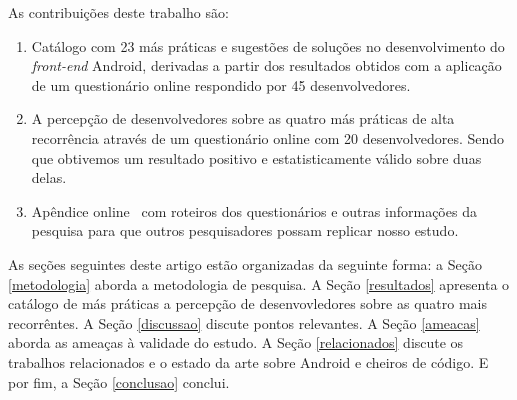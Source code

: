 
As contribuições deste trabalho são:

\begin{enumerate}

	\item Catálogo com 23 más práticas e sugestões de soluções no desenvolvimento do \textit{front-end} Android, derivadas a partir dos resultados obtidos com a aplicação de um questionário online respondido por 45 desenvolvedores.

	\item A percepção de desenvolvedores sobre as quatro más práticas de alta recorrência através de um questionário online com 20 desenvolvedores. Sendo que obtivemos um resultado positivo e estatisticamente válido sobre duas delas.

	\item Apêndice online~\cite{apendice} com roteiros dos questionários e outras informações da pesquisa para que outros pesquisadores possam replicar nosso estudo.

\end{enumerate}



As seções seguintes deste artigo estão organizadas da seguinte forma: a Seção \ref{metodologia} aborda a metodologia de pesquisa. A Seção \ref{resultados} apresenta o catálogo de más práticas a percepção de desenvovledores sobre as quatro mais recorrêntes. A Seção \ref{discussao} discute pontos relevantes. A Seção \ref{ameacas} aborda as ameaças à validade do estudo. A Seção \ref{relacionados} discute os trabalhos relacionados e o estado da arte sobre Android e cheiros de código. E por fim, a Seção \ref{conclusao} conclui.
